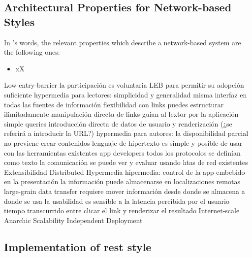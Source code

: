 \subsection{Architectural Properties for Network-based Styles}
\label{sec:network_properties}

In \citeauthor{fielding_architectural_2000}'s words, the relevant properties which describe a network-based system are the following ones:
\begin{itemize}
 \item xX
\end{itemize}



    Low entry-barrier
        la participación es voluntaria
        LEB para permitir su adopción suficiente
        hypermedia para lectores:
            simplicidad y generalidad
                misma interfaz en todas las fuentes de información
            flexibilidad
                con links puedes estructurar ilimitadamente
            manipulación directa de links
                guian al lextor por la aplicación
            simple queries
                introducción directa de datos de usuario y renderización (¿se referirá a introducir la URL?)
        hypermedia para autores:
            la disponibilidad parcial no previene crear contenidos
            lenguaje de hipertexto es simple y posible de usar con las herramientas existentes
        app developers
            todos los protocolos se definían como texto
            la comunicación se puede ver y evaluar usando htas de red existentes
    Extensibilidad
    Distributed Hypermedia
        hipermedia: control de la app embebido en la presentación
        la información puede almacenarse en localizaciones remotas
        large-grain data transfer
            requiere mover información desde donde se almacena a donde se usa
        la usabilidad es sensible a la latencia percibida por el usuario
            tiempo transcurrido entre clicar el link y renderizar el resultado
    Internet-scale
        Anarchic Scalability
        Independent Deployment


\subsection{Implementation of \ac{rest} style}
